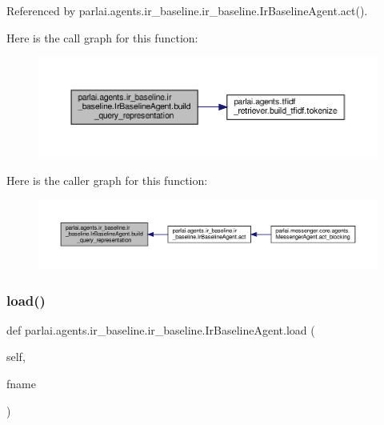 Referenced by parlai.\+agents.\+ir\+\_\+baseline.\+ir\+\_\+baseline.\+Ir\+Baseline\+Agent.\+act().

Here is the call graph for this function\+:
\nopagebreak
\begin{figure}[H]
\begin{center}
\leavevmode
\includegraphics[width=350pt]{classparlai_1_1agents_1_1ir__baseline_1_1ir__baseline_1_1IrBaselineAgent_a87f02e724544fa1531486c1f8f0e2f68_cgraph}
\end{center}
\end{figure}
Here is the caller graph for this function\+:
\nopagebreak
\begin{figure}[H]
\begin{center}
\leavevmode
\includegraphics[width=350pt]{classparlai_1_1agents_1_1ir__baseline_1_1ir__baseline_1_1IrBaselineAgent_a87f02e724544fa1531486c1f8f0e2f68_icgraph}
\end{center}
\end{figure}
\mbox{\label{classparlai_1_1agents_1_1ir__baseline_1_1ir__baseline_1_1IrBaselineAgent_a3701001e1de9bcc2d110a318799101c1}} 
\subsubsection{\texorpdfstring{load()}{load()}}
{\footnotesize\ttfamily def parlai.\+agents.\+ir\+\_\+baseline.\+ir\+\_\+baseline.\+Ir\+Baseline\+Agent.\+load (\begin{DoxyParamCaption}\item[{}]{self,  }\item[{}]{fname }\end{DoxyParamCaption})}

